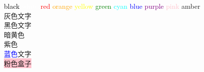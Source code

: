 \documentclass{ctexart}
\begin{document}
\textcolor{black}{black}
\textcolor{white}{white}
\textcolor{red}{red}
\textcolor{orange}{orange}
\textcolor{yellow}{yellow}
\textcolor{green}{green}
\textcolor{cyan}{cyan}
\textcolor{blue}{blue}
\textcolor{purple}{purple}
\textcolor{pink}{pink}
\textcolor{amber}{amber}\\
\color[gray]{0.5}灰色文字\\
\color{black}黑色文字\\
\color[rgb]{0.6,0.6,0}暗黄色\\
\textcolor[named]{Purple,0.6}{紫色}\\
\textcolor{blue}{蓝色}文字\\
\colorbox{pink}{粉色盒子}\\
\\
\end{document}
